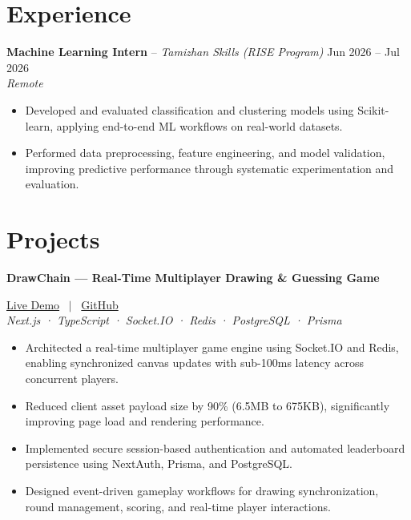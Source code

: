 \documentclass[10pt, a4paper]{article}
\begin{document}

\section{Experience}

\noindent \textbf{Machine Learning Intern} -- \textit{Tamizhan Skills (RISE Program)} \hfill Jun 2026 -- Jul 2026 \\
\textit{\small{Remote}} \\
\begin{itemize}

    \item Developed and evaluated classification and clustering models using Scikit-learn, applying end-to-end ML workflows on real-world datasets.

    \item Performed data preprocessing, feature engineering, and model validation, improving predictive performance through systematic experimentation and evaluation.

\end{itemize}
\vspace{2pt}



\section{Projects}

\noindent \textbf{DrawChain --- Real-Time Multiplayer Drawing \& Guessing Game} \hfill 

\small{
\href{https://drawchain.logiclane.online/}{Live Demo}
 \ $|$ \ \href{https://github.com/PankajKumar-11/DrawChain-}{GitHub}
}
 \\
\textit{\small{Next.js · TypeScript · Socket.IO · Redis · PostgreSQL · Prisma}}
\begin{itemize}

    \item Architected a real-time multiplayer game engine using Socket.IO and Redis, enabling synchronized canvas updates with sub-100ms latency across concurrent players.

    \item Reduced client asset payload size by 90\% (6.5MB to 675KB), significantly improving page load and rendering performance.

    \item Implemented secure session-based authentication and automated leaderboard persistence using NextAuth, Prisma, and PostgreSQL.

    \item Designed event-driven gameplay workflows for drawing synchronization, round management, scoring, and real-time player interactions.

\end{itemize}
\vspace{3pt}
\end{document}
